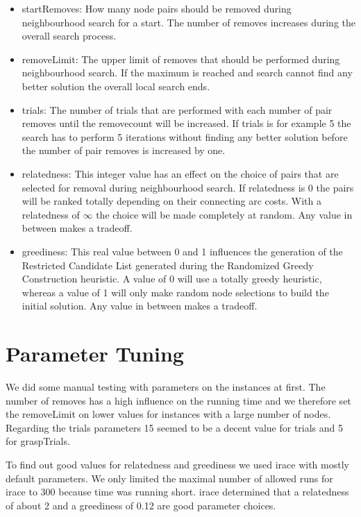 \documentclass[a4paper]{scrartcl}
\begin{document}
\begin{itemize}
  \item startRemoves: How many node pairs should be removed during neighbourhood search for a start. The number of removes increases during the overall search process.
  \item removeLimit: The upper limit of removes that should be performed during neighbourhood search. If the maximum is reached and search cannot find any better solution the overall local search ends.

  \item trials: The number of trials that are performed with each number of pair removes until the removecount will be increased. If trials is for example 5 the search has to perform 5 iterations without finding any better solution before the number of pair removes is increased by one.

  \item relatedness: This integer value has an effect on the choice of pairs that are selected for removal during neighbourhood search. If relatedness is 0 the pairs will be ranked totally depending on their connecting arc costs. With a relatedness of $\infty$ the choice will be made completely at random. Any value in between makes a tradeoff.

  \item greediness: This real value between 0 and 1 influences the generation of the Restricted Candidate List generated during the Randomized Greedy Construction heuristic. A value of 0 will use a totally greedy heuristic, whereas a value of 1 will only make random node selections to build the initial solution. Any value in between makes a tradeoff.
\end{itemize}

\section{Parameter Tuning}
We did some manual testing with parameters on the instances at first. The number of removes has a high influence on the running time and we therefore set the removeLimit on lower values for instances with a large number of nodes. Regarding the trials parameters 15 seemed to be a decent value for trials and 5 for graspTrials.

To find out good values for relatedness and greediness we used irace \cite{lopez2011irace} with mostly default parameters. We only limited the maximal number of allowed runs for irace to 300 because time was running short. irace determined that a relatedness of about 2 and a greediness of 0.12 are good parameter choices.
\end{document}
